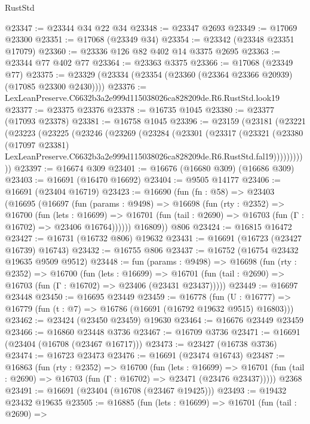 \begin{lexlean}{RustStd}
\begin{coremodule}
@23347 := @23344 @34 @22 @34
@23348 := @23347 @2693
@23349 := @17069 @23300
@23351 := @17068 (@23349 @34)
@23354 := @23342 (@23348 @23351 @17079)
@23360 := @23336 @126 @82 @402 @14 @3375 @2695
@23363 := @23344 @77 @402 @77
@23364 := @23363 @3375
@23366 := @17068 (@23349 @77)
@23375 := @23329 (@23334 (@23354 (@23360 (@23364 @23366 @20939) (@17085 @23300 @2430))))
@23376 := LexLeanPreserve.C6632b3a2e999d115038026ca828209de.R6.RustStd.look19
@23377 := @23375 @23376
@23378 := @16735 @1045
@23380 := @23377 (@17093 @23378)
@23381 := @16758 @1045
@23396 := @23159
    (@23181
      (@23221
        (@23223
          (@23225
            (@23246
              (@23269
                (@23284
                  (@23301
                    (@23317
                      (@23321
                        (@23380
                          (@17097 @23381)
                          LexLeanPreserve.C6632b3a2e999d115038026ca828209de.R6.RustStd.fal19)))))))))))
@23397 := @16674 @309
@23401 := @16676 (@16680 @309) (@16686 @309)
@23403 := @16691 (@16470 @16692)
@23404 := @9505 @14177
@23406 := @16691 (@23404 @16719)
@23423 := @16690
    (fun (fn : @58) =>
    @23403
      (@16695
        (@16697
          (fun (params : @9498) =>
          @16698
            (fun (rty : @2352) =>
            @16700
              (fun (lets : @16699) =>
              @16701 (fun (tail : @2690) => @16703 (fun (Γ : @16702) => @23406 @16764))))))
        @16809))
    @806
@23424 := @16815 @16472
@23427 := @16731 (@16732 @806) @19632
@23431 := @16691 (@16723 (@23427 @16739) @16743)
@23432 := @16755 @806
@23437 := @16752 (@16754 @23432 @19635 @9509 @9512)
@23448 := fun (params : @9498) =>
  @16698
    (fun (rty : @2352) =>
    @16700
      (fun (lets : @16699) =>
      @16701 (fun (tail : @2690) => @16703 (fun (Γ : @16702) => @23406 (@23431 @23437)))))
@23449 := @16697 @23448
@23450 := @16695 @23449
@23459 := @16778
    (fun (U : @16777) => @16779 (fun (t : @7) => @16786 (@16691 (@16792 @19632 @9515) @16803)))
@23462 := @23424 (@23450 @23459) @19630
@23464 := @16676 @23449 @23459
@23466 := @16860 @23448 @3736
@23467 := @16709 @3736
@23471 := @16691 (@23404 (@16708 (@23467 @16717)))
@23473 := @23427 (@16738 @3736)
@23474 := @16723 @23473
@23476 := @16691 (@23474 @16743)
@23487 := @16863
    (fun (rty : @2352) =>
    @16700
      (fun (lets : @16699) =>
      @16701 (fun (tail : @2690) => @16703 (fun (Γ : @16702) => @23471 (@23476 @23437)))))
    @2368
@23491 := @16691 (@23404 (@16708 (@23467 @19425)))
@23493 := @19432 @23432 @19635
@23505 := @16885
    (fun (lets : @16699) =>
    @16701
      (fun (tail : @2690) =>

\end{coremodule}
\end{lexlean}
